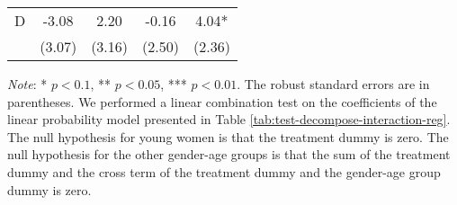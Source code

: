 \documentclass[12pt, a4paper]{article}
\begin{document}
\begin{table}[H]
\begin{threeparttable}
\begin{tabular}[t]{lcccc}
\hspace{1em}D & -3.08 & 2.20 & -0.16 & 4.04*\\
\hspace{1em} & (3.07) & (3.16) & (2.50) & (2.36)\\
\bottomrule
\end{tabular}
\begin{tablenotes}
\item \emph{Note}: * $p < 0.1$, ** $p < 0.05$, *** $p < 0.01$. The robust standard errors are in parentheses. We performed a linear combination test on the coefficients of the linear probability model presented in Table \ref{tab:test-decompose-interaction-reg}. The null hypothesis for young women is that the treatment dummy is zero. The null hypothesis for the other gender-age groups is that the sum of the treatment dummy and the cross term of the treatment dummy and the gender-age group dummy is zero.
\end{tablenotes}
\end{threeparttable}
\end{table}
\end{document}
